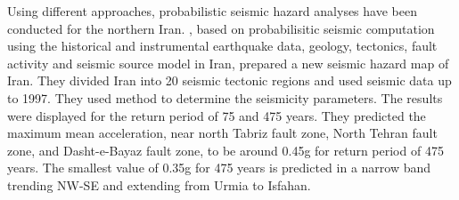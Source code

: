 
Using different approaches, probabilistic seismic hazard analyses have been conducted for the northern Iran. \citet{Tavakoli1999}, based on probabilisitic seismic computation using the historical and instrumental earthquake data, geology, tectonics, fault activity and seismic source model in Iran, prepared a new seismic hazard map of Iran. They divided Iran into 20 seismic tectonic regions and used seismic data up to 1997. They used \citet{Kijko1992} method  to determine the seismicity parameters. The results were displayed for the return period of 75 and 475 years. They predicted the maximum mean acceleration, near north Tabriz fault zone, North Tehran fault zone, and Dasht-e-Bayaz fault zone, to be around 0.45g for return period of 475 years. The smallest value of 0.35g for 475 years is predicted in a narrow band trending NW-SE and extending from Urmia to Isfahan.  

